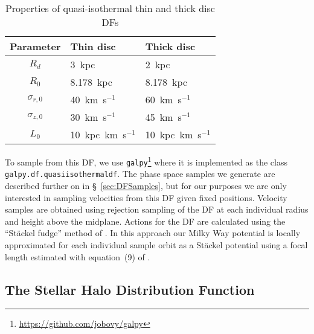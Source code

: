 \begin{table}
    \begin{center}
        \caption{Properties of quasi-isothermal thin and thick disc DFs}
        \label{table:discDFParameters}
        \begin{tabular}{cll}
            Parameter & Thin disc & Thick disc  \\
            \hline
            $R_{d}$          & 3~kpc               & 2~kpc              \\
            $R_{0}$          & 8.178~kpc           & 8.178~kpc          \\
            $\sigma_{r,0}$   & 40~km~s$^{-1}$      & 60~km~s$^{-1}$     \\
            $\sigma_{z,0}$   & 30~km~s$^{-1}$      & 45~km~s$^{-1}$     \\
            $L_{0}$          & 10~kpc~km~s$^{-1}$  & 10~kpc~km~s$^{-1}$ \\
        \end{tabular}
    \end{center}
\end{table}

To sample from this DF, we use \texttt{galpy}\footnote{\url{https://github.com/jobovy/galpy}} \citep{bovy15} where it is implemented as the class \texttt{galpy.df.quasiisothermaldf}. The phase space samples we generate are described further on in \S~\ref{sec:DFSamples}, but for our purposes we are only interested in sampling velocities from this DF given fixed positions. Velocity samples are obtained using rejection sampling of the DF at each individual radius and height above the midplane. Actions for the DF are calculated using the ``St\"{a}ckel fudge'' method of \citet{binney12}. In this approach our Milky Way potential is locally approximated for each individual sample orbit as a St\"{a}ckel potential using a focal length estimated with equation~(9) of \citet{sanders12}.

\subsection{The Stellar Halo Distribution Function}
\label{subsec:HaloDistributionFunction}

